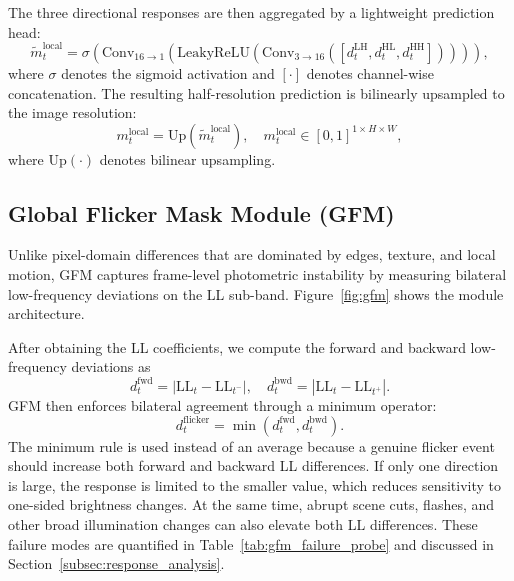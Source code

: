 \documentclass[applsci,article,submit,pdftex,moreauthors]{Definitions/mdpi}
\begin{document}
The three directional responses are then aggregated by a lightweight prediction head:
\begin{equation}\label{eq:local_mask}
    \tilde{m}_t^{\mathrm{local}}=\sigma\!\left(\mathrm{Conv}_{16\to1}\!\left(\mathrm{LeakyReLU}\!\left(\mathrm{Conv}_{3\to16}\!\left([d_t^{\mathrm{LH}},d_t^{\mathrm{HL}},d_t^{\mathrm{HH}}]\right)\right)\right)\right),
\end{equation}
where $\sigma$ denotes the sigmoid activation and $[\cdot]$ denotes channel-wise concatenation. The resulting half-resolution prediction is bilinearly upsampled to the image resolution:
\begin{equation}\label{eq:local_mask_up}
    m_t^{\mathrm{local}}=\mathrm{Up}(\tilde{m}_t^{\mathrm{local}}), \quad m_t^{\mathrm{local}}\in[0,1]^{1\times H\times W},
\end{equation}
where $\mathrm{Up}(\cdot)$ denotes bilinear upsampling.

\subsection{Global Flicker Mask Module (GFM)}\label{subsec:flicker}

Unlike pixel-domain differences that are dominated by edges, texture, and local motion, GFM captures frame-level photometric instability by measuring bilateral low-frequency deviations on the LL sub-band. Figure~\ref{fig:gfm} shows the module architecture.

After obtaining the LL coefficients, we compute the forward and backward low-frequency deviations as
\begin{equation}\label{eq:flicker_diff}
    d_t^{\mathrm{fwd}}=|\mathrm{LL}_t-\mathrm{LL}_{t^-}|,\quad d_t^{\mathrm{bwd}}=|\mathrm{LL}_t-\mathrm{LL}_{t^+}|.
\end{equation}
GFM then enforces bilateral agreement through a minimum operator:
\begin{equation}\label{eq:flicker_min}
    d_t^{\mathrm{flicker}}=\min(d_t^{\mathrm{fwd}},d_t^{\mathrm{bwd}}).
\end{equation}
The minimum rule is used instead of an average because a genuine flicker event should increase both forward and backward LL differences. If only one direction is large, the response is limited to the smaller value, which reduces sensitivity to one-sided brightness changes. At the same time, abrupt scene cuts, flashes, and other broad illumination changes can also elevate both LL differences. These failure modes are quantified in Table~\ref{tab:gfm_failure_probe} and discussed in Section~\ref{subsec:response_analysis}.
\end{document}
